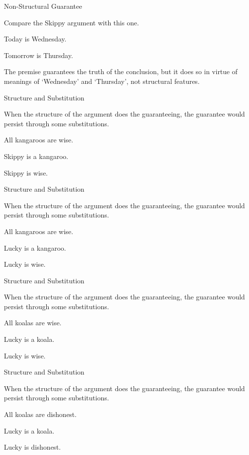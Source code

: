 \documentclass[
  ignorenonframetext,
]{beamer}
\renewcommand{\,}{\text{, }}
\renewenvironment*{quote}	
	{\list{}{\rightmargin   \leftmargin} \item } 	
	{\endlist }
\newcommand{\DisplayArg}[2]{
\begin{enumerate}
{#1}
\end{enumerate}
\vspace{-6pt}
\hrulefill

\begin{quote}
{\normalfont #2}
\end{quote}
\vspace{12pt}
}
\begin{document}
\begin{frame}{Non-Structural Guarantee}
\protect\hypertarget{non-structural-guarantee}{}

Compare the Skippy argument with this one.

\DisplayArg{ \item Today is Wednesday. } { Tomorrow is Thursday. }

The premise guarantees the truth of the conclusion, but it does so in
virtue of meanings of `Wednesday' and `Thursday', not structural
features.

\end{frame}

\begin{frame}{Structure and Substitution}
\protect\hypertarget{structure-and-substitution}{}

When the structure of the argument does the guaranteeing, the guarantee
would persist through some substitutions.

\DisplayArg{ \item All kangaroos are wise. \item Skippy is a kangaroo. } { Skippy is wise. }

\end{frame}

\begin{frame}{Structure and Substitution}
\protect\hypertarget{structure-and-substitution-1}{}

When the structure of the argument does the guaranteeing, the guarantee
would persist through some substitutions.

\DisplayArg{ \item All kangaroos are wise. \item Lucky is a kangaroo. } { Lucky is wise. }

\end{frame}

\begin{frame}{Structure and Substitution}
\protect\hypertarget{structure-and-substitution-2}{}

When the structure of the argument does the guaranteeing, the guarantee
would persist through some substitutions.

\DisplayArg{ \item All koalas are wise. \item Lucky is a koala. } { Lucky is wise. }

\end{frame}

\begin{frame}{Structure and Substitution}
\protect\hypertarget{structure-and-substitution-3}{}

When the structure of the argument does the guaranteeing, the guarantee
would persist through some substitutions.

\DisplayArg{ \item All koalas are dishonest. \item Lucky is a koala. } { Lucky is dishonest. }

\end{frame}
\end{document}

